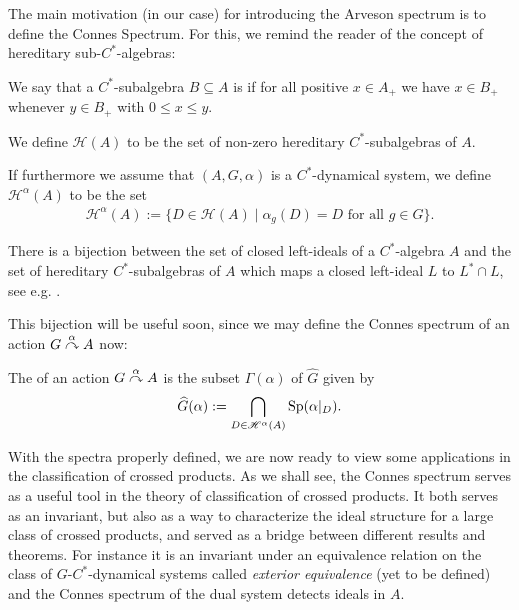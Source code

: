 The main motivation (in our case) for introducing the Arveson spectrum is to define the Connes Spectrum. For this, we remind the reader of the concept of hereditary sub-$C^*$-algebras:
\begin{definition}
	We say that a $C^*$-subalgebra $B\subseteq A$ is  if for all positive $x \in A_+$ we have $x \in B_+$ whenever $y \in B_+$ with $0 \leq x \leq y$. 
	
	We define $\mathscr{H}(A)$ to be the set of non-zero hereditary $C^*$-subalgebras of $A$. 
	
	If furthermore we assume that $(A, G, \alpha)$ is a $C^*$-dynamical system, we define $\mathscr{H}^\alpha(A)$ to be the set
	\begin{align*}
		\mathscr{H}^\alpha (A) := \{ D \in \mathscr{H}(A) \mid \alpha_g(D)=D \text{ for all } g \in G\}.
	\end{align*}
\end{definition}
\begin{remark}
	There is a bijection between the set of closed left-ideals of a $C^*$-algebra $A$ and the set of hereditary $C^*$-subalgebras of $A$ which maps a closed left-ideal $L$ to $L^* \cap L$, see e.g. \cite[II.5.3.2]{blackadar}.
\end{remark}
This bijection will be useful soon, since we may define the Connes spectrum of an action $G \stackrel{\alpha}{\curvearrowright} A$ now:
\begin{definition}
	The  of an action $G \stackrel{\alpha}{\curvearrowright} A$ is the subset $\Gamma(\alpha)$ of $\hat G$ given by
	\begin{align*}
		\widehat{G} ( \alpha) := \bigcap_{D \in \mathscr{H}^\alpha (A)} \mathrm{Sp}(\alpha|_D).
	\end{align*}
\end{definition}
With the spectra properly defined, we are now ready to view some applications in the classification of crossed products.
As we shall see, the Connes spectrum serves as a useful tool in the theory of classification of crossed products. It both serves as an invariant, but also as a way to characterize the ideal structure for a large class of crossed products, and served as a bridge between different results and theorems. For instance it is an invariant under an equivalence relation on the class of $G$-$C^*$-dynamical systems called \textit{exterior equivalence} (yet to be defined) and the Connes spectrum of the dual system detects ideals in $A$. 

